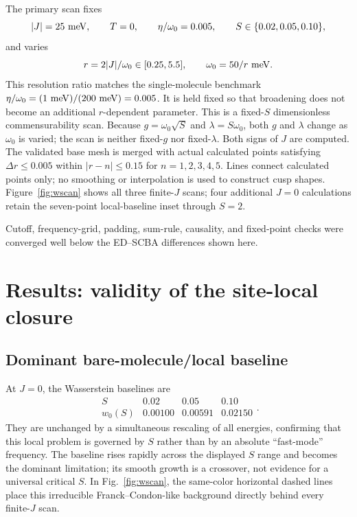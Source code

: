 \documentclass[11pt]{article}
\begin{document}
The primary scan fixes
\begin{equation}
 |J|=25~{\rm meV},\qquad T=0,\qquad \eta/\omega_0=0.005,
 \qquad S\in\{0.02,0.05,0.10\},
\end{equation}
and varies
\begin{equation}
 r=2|J|/\omega_0\in[0.25,5.5],\qquad
 \omega_0=50/r~{\rm meV}.
\end{equation}
This resolution ratio matches the single-molecule benchmark
$\eta/\omega_0=(1~{\rm meV})/(200~{\rm meV})=0.005$.
It is held fixed so that broadening does not become an additional
$r$-dependent parameter.  This is a fixed-$S$ dimensionless
commensurability scan.  Because
$g=\omega_0\sqrt S$ and $\lambda=S\omega_0$, both $g$ and $\lambda$ change
as $\omega_0$ is varied; the scan is neither fixed-$g$ nor fixed-$\lambda$.
Both signs of $J$ are computed.  The validated base mesh is merged with actual
calculated points satisfying $\Delta r\leq0.005$ within $|r-n|\leq0.15$ for
$n=1,2,3,4,5$.  Lines connect calculated points only; no smoothing or
interpolation is used to construct cusp shapes.  Figure~\ref{fig:wscan}
shows all three finite-$J$ scans; four additional $J=0$ calculations retain
the seven-point local-baseline inset through $S=2$.

Cutoff, frequency-grid, padding, sum-rule, causality, and fixed-point checks
were converged well below the ED--SCBA differences shown here.

\section{Results: validity of the site-local closure}

\subsection{Dominant bare-molecule/local baseline}

At $J=0$, the Wasserstein baselines are
\begin{equation}
 \begin{array}{c|ccc}
 S&0.02&0.05&0.10\\ \hline
 w_0(S)&0.00100&0.00591&0.02150
 \end{array}.
\label{eq:j0numbers}
\end{equation}
They are unchanged by a simultaneous rescaling of all energies, confirming
that this local problem is governed by $S$ rather than by an absolute
``fast-mode'' frequency.  The baseline rises rapidly across the displayed
$S$ range and becomes the dominant limitation; its smooth growth is a
crossover, not evidence for a universal critical $S$.  In
Fig.~\ref{fig:wscan}, the same-color horizontal dashed lines place this
irreducible Franck--Condon-like background directly behind every finite-$J$
scan.
\end{document}
